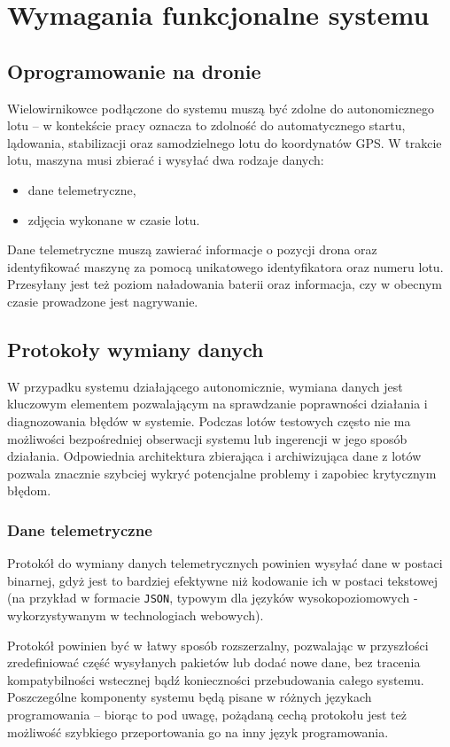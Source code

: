 \chapter{Wymagania funkcjonalne systemu}

\section{Oprogramowanie na dronie}

Wielowirnikowce podłączone do systemu muszą być
zdolne do autonomicznego lotu -- w kontekście pracy
oznacza to zdolność do automatycznego startu,
lądowania, stabilizacji oraz samodzielnego
lotu do koordynatów GPS. W trakcie lotu, maszyna musi
zbierać i wysyłać dwa rodzaje danych:
\begin{itemize}
    \item dane telemetryczne,
    \item zdjęcia wykonane w czasie lotu.
\end{itemize}

Dane telemetryczne muszą zawierać informacje o pozycji
drona oraz identyfikować maszynę za pomocą unikatowego
identyfikatora oraz numeru lotu. Przesyłany jest też
poziom naładowania baterii oraz informacja, czy w obecnym
czasie prowadzone jest nagrywanie.

\section{Protokoły wymiany danych}

W przypadku systemu działającego autonomicznie, wymiana danych jest kluczowym
elementem pozwalającym na sprawdzanie poprawności działania
i diagnozowania błędów w systemie. Podczas lotów testowych
często nie ma możliwości bezpośredniej obserwacji systemu
lub ingerencji w jego sposób działania. Odpowiednia architektura
zbierająca i archiwizująca dane z lotów pozwala znacznie szybciej 
wykryć potencjalne problemy i zapobiec krytycznym błędom. 

\subsection{Dane telemetryczne}
Protokół do wymiany danych telemetrycznych powinien
wysyłać dane w postaci binarnej, gdyż jest to bardziej
efektywne niż kodowanie ich w postaci tekstowej (na
przykład w formacie \texttt{JSON}, typowym dla języków
wysokopoziomowych - wykorzystywanym w technologiach webowych).

Protokół powinien być w łatwy sposób rozszerzalny,
pozwalając w przyszłości zredefiniować część wysyłanych
pakietów lub dodać nowe dane, bez tracenia kompatybilności
wstecznej bądź konieczności przebudowania całego systemu.
Poszczególne komponenty systemu będą pisane w różnych
językach programowania -- biorąc to pod uwagę, pożądaną
cechą protokołu jest też możliwość szybkiego przeportowania
go na inny język programowania. 

